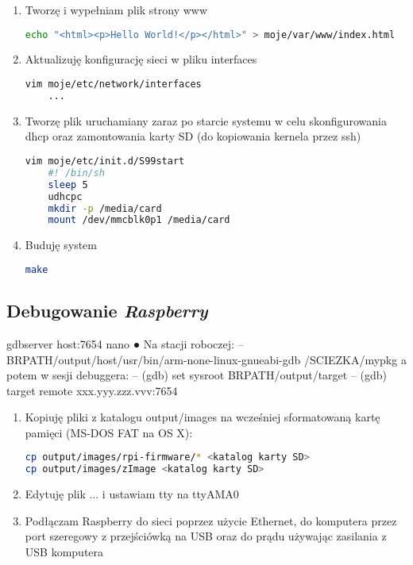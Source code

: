 \begin{enumerate}
	\item Tworzę i wypełniam plik strony www
	\begin{lstlisting}[language=bash]
echo "<html><p>Hello World!</p></html>" > moje/var/www/index.html 
	\end{lstlisting}
		
	\item Aktualizuję konfigurację sieci w pliku interfaces
	\begin{lstlisting}[language=bash]
	vim moje/etc/network/interfaces
	...
	\end{lstlisting}
		
	\item Tworzę plik uruchamiany zaraz po starcie systemu w celu skonfigurowania dhcp oraz zamontowania karty SD (do kopiowania kernela przez ssh)
	\begin{lstlisting}[language=bash]
	vim moje/etc/init.d/S99start
	#! /bin/sh
	sleep 5
	udhcpc
	mkdir -p /media/card
	mount /dev/mmcblk0p1 /media/card
	\end{lstlisting}
		
	\item Buduję system
	\begin{lstlisting}[language=bash]
	make
	\end{lstlisting}		
\end{enumerate}

\subsection{Debugowanie \emph{Raspberry}}
gdbserver host:7654 nano
●
Na stacji roboczej:
–
BRPATH/output/host/usr/bin/arm-none-linux-gnueabi-gdb /SCIEZKA/mypkg
a potem w sesji debuggera:
–
(gdb) set sysroot BRPATH/output/target
–
(gdb) target remote xxx.yyy.zzz.vvv:7654




\begin{enumerate}
\item Kopiuję pliki z katalogu output/images na wcześniej sformatowaną kartę pamięci (MS-DOS FAT na OS X):	\begin{lstlisting}[language=bash]
cp output/images/rpi-firmware/* <katalog karty SD>
cp output/images/zImage <katalog karty SD>
\end{lstlisting}	

\item Edytuję plik ... i ustawiam tty na ttyAMA0
\item Podłączam Raspberry do sieci poprzez użycie Ethernet, do komputera przez port szeregowy z przejściówką na USB oraz do prądu używając zasilania z USB komputera

\end{enumerate}
